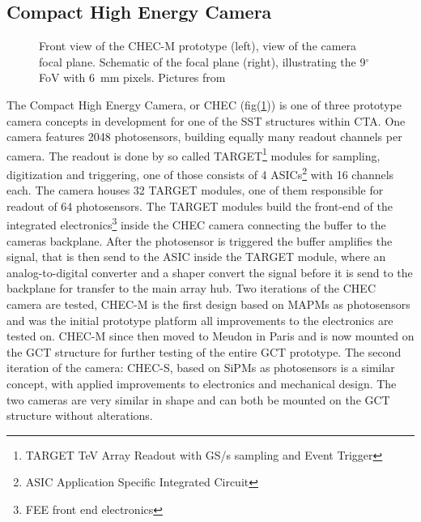 \documentclass[12pt,article,type=msc,colorback,accentcolor=tud9c]{tudthesis}
\begin{document}
\subsection{Compact High Energy Camera}
\begin{figure}[b!]
\begin{centering}
\caption[CHEC focal plane]{Front view of the CHEC-M prototype (left), view of the camera focal plane. Schematic of the focal plane (right), illustrating the 9$^\circ$ FoV with 6~mm pixels. Pictures from \cite{Rich}}
\label{fig:GCT_Pic}
\end{centering}
\end{figure}


The Compact High Energy Camera, or CHEC (fig(\ref{fig:GCT_Pic})) is one of three prototype camera concepts in development for one of the SST structures within CTA. One camera features 2048 photosensors, building equally many readout channels per camera. The readout is done by so called TARGET\footnote{TARGET TeV Array Readout with GS/s sampling and Event Trigger} modules for sampling, digitization and triggering, one of those consists of 4 ASICs\footnote{ASIC Application Specific Integrated Circuit} with 16 channels each. The camera houses 32 TARGET modules, one of them responsible for readout of 64 photosensors. The TARGET modules build the front-end of the integrated electronics\footnote{FEE front end electronics} inside the CHEC camera connecting the buffer to the cameras backplane. After the photosensor is triggered the buffer amplifies the signal, that is then send to the ASIC inside the TARGET module, where an analog-to-digital converter and a shaper convert the signal before it is send to the backplane for transfer to the main array hub. Two iterations of the CHEC camera are tested, CHEC-M is the first design based on MAPMs as photosensors and was the initial prototype platform all improvements to the electronics are tested on. CHEC-M since then moved to Meudon in Paris and is now mounted on the GCT structure for further testing of the entire GCT prototype. The second iteration of the camera: CHEC-S, based on SiPMs as photosensors is a similar concept, with applied improvements to electronics and mechanical design. The two cameras are very similar in shape and can both be mounted on the GCT structure without alterations.\\
\end{document}
